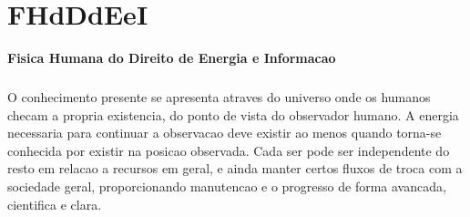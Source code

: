 \documentclass[a4paper,11pt]{book}
\begin{document}
\chapter{FHdDdEeI}
\begin{center}
  \textbf{Fisica Humana do Direito de Energia e Informacao}
\end{center}
\paragraph{}O conhecimento presente se apresenta atraves do universo onde os humanos checam a
\linebreak
propria existencia, do ponto de vista do observador humano.
\linebreak
A energia necessaria para continuar a observacao deve existir ao menos quando
\linebreak
torna-se conhecida por existir na posicao observada.
\linebreak
\linebreak
Cada ser pode ser independente do resto em relacao a recursos em geral, e ainda 
\linebreak
manter certos fluxos de troca com a sociedade geral, proporcionando manutencao e 
\linebreak
o	progresso de forma avancada, cientifica e clara.
\linebreak
\end{document}
